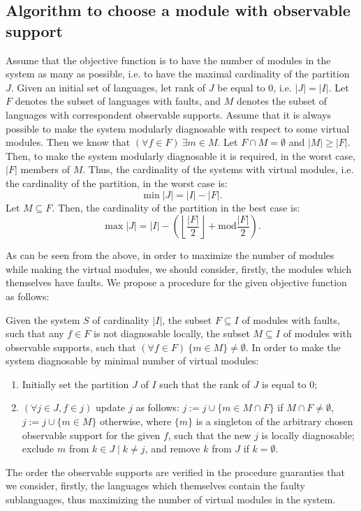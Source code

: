 \documentclass[a4paper, 10pt, conference]{ieeeconf}
\begin{document}
\subsection{Algorithm to choose a module with observable support}
Assume that the objective function is to have the number of modules in the
system as many as possible, i.e. to have the maximal cardinality of the
partition $J$.
Given an initial set of languages, let rank of $J$ be equal to 0, i.e. $|J| =
|I|$. Let $F$ denotes the subset of languages with faults, and $M$ denotes the
subset of languages with correspondent observable supports.
Assume that it is always possible to make the system modularly diagnosable with
respect to some virtual modules. Then we know that $(\forall f \in F)~\exists m
\in M$. Let $F \cap M = \emptyset$ and $|M| \geq |F|$. Then, to make the system
modularly diagnosable it is required, in the worst case, $|F|$ members of $M$.
Thus, the cardinality of the systems with virtual modules, i.e. the cardinality
of the partition, in the worst case is:
\begin{equation}
	\min |J| = |I| - |F|.
\end{equation}
Let $M \subseteq F$. Then, the cardinality of the partition in the best case
is:
\begin{equation}
	\max |J| = |I| - \left(
		\left\lfloor \frac{|F|}{2} \right\rfloor + \textrm{mod} \frac{|F|}{2}
		\right). 
\end{equation}

As can be seen from the above, in order to maximize the number of modules while
making the virtual modules, we should consider, firstly, the modules which
themselves have faults. We propose a procedure for the given objective function
as follows:

Given the system $S$ of cardinality $|I|$, the subset $F
\subseteq I$ of modules with faults, such that any $f\in F$ is not diagnosable
locally, the subset $M \subseteq I$ of modules with observable supports, such
that $(\forall f \in F)~\{m \in M\}\neq \emptyset$. In order to make the system
diagnosable by minimal number of virtual modules: 
\begin{enumerate}
  \item Initially set the partition $J$ of $I$ such that the rank of $J$ is
  equal to 0;
  \item $(\forall j \in J, f \in j)$ update $j$ as follows: 
  	$j := j \cup \{m \in M \cap F\}$ if $M \cap F \neq \emptyset$,
 $j := j \cup \{m \in M\}$ otherwise, where $\{m\}$ is a singleton of the
 arbitrary chosen observable support for the given $f$, such that the new $j$
 is locally diagnosable; exclude $m$ from $k \in J \mid k \neq j$, and remove
 $k$ from $J$ if $k=\emptyset$.
\end{enumerate} 
The order the observable supports are verified in the procedure guaranties that
we consider, firstly, the languages which themselves contain the faulty
sublanguages, thus maximizing the number of virtual modules in the system.
\end{document}
